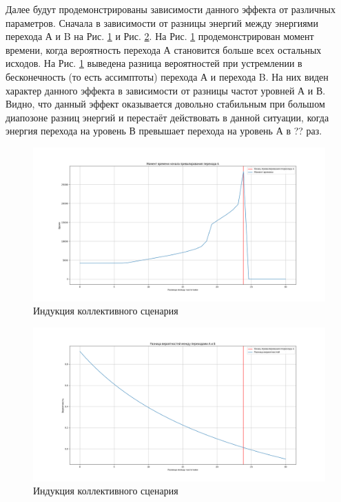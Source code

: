 \documentclass[12pt]{article}
\begin{document}
Далее будут продемонстрированы зависимости данного эффекта от различных параметров. Сначала в зависимости от разницы энергий между энергиями перехода А и B на Рис. \ref{fig:en_time} и Рис. \ref{fig:en_prob_diff}. На Рис. \ref{fig:en_time} продемонстрирован момент времени, когда вероятность перехода А становится больше всех остальных исходов. На Рис. \ref{fig:en_time} выведена разница вероятностей при устремлении в бесконечность (то есть ассимптоты) перехода А и перехода B. На них виден характер данного эффекта в зависимости от разницы частот уровней А и В. Видно, что данный эффект оказывается довольно стабильным при большом диапозоне разниц энергий и перестаёт действовать в данной ситуации, когда энергия перехода на уровень В превышает перехода на уровень А в ?? раз.

\begin{figure}[H]
\centering
\includegraphics[scale=1.7]{w_time.png} 
\caption{ Индукция коллективного сценария}
\label{fig:en_time}
\end{figure}

\begin{figure}[H]
\centering
\includegraphics[scale=1.7]{w_prob_diff.png} 
\caption{ Индукция коллективного сценария}
\label{fig:en_prob_diff}
\end{figure}
\end{document}
